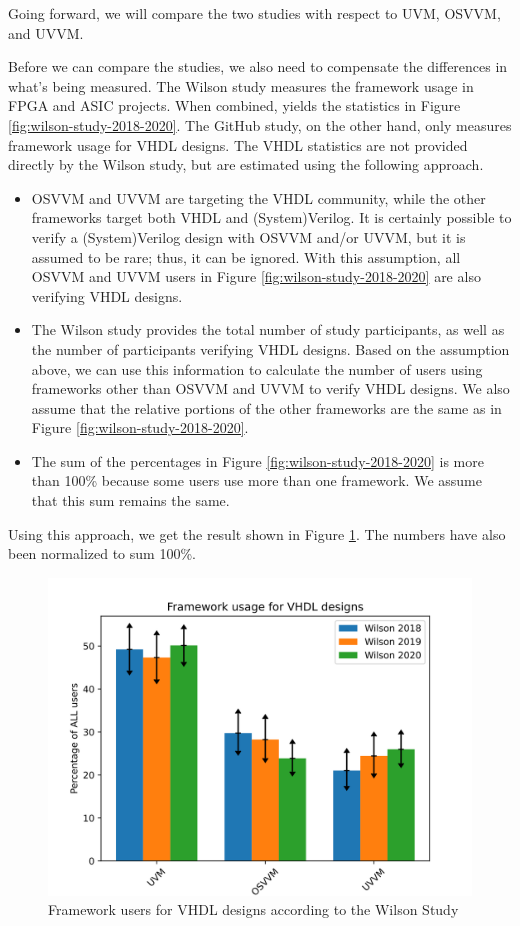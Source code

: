 \documentclass[]{article}
\providecommand{\tightlist}{%
  \setlength{\itemsep}{0pt}\setlength{\parskip}{0pt}}
\begin{document}
Going forward, we will compare the two studies with respect to UVM, OSVVM, and UVVM.

Before we can compare the studies, we also need to compensate the differences in what's being measured. The Wilson study measures the framework usage in FPGA and ASIC projects. When combined, yields the statistics in Figure \ref{fig:wilson-study-2018-2020}. The GitHub study, on the other hand, only measures framework usage for VHDL designs. The VHDL statistics are not provided directly by the Wilson study, but are estimated using the following approach.

\begin{itemize}
\tightlist
\item
  OSVVM and UVVM are targeting the VHDL community, while the other frameworks target both VHDL and (System)Verilog. It is certainly possible to verify a (System)Verilog design with OSVVM and/or UVVM, but it is assumed to be rare; thus, it can be ignored. With this assumption, all OSVVM and UVVM users in Figure \ref{fig:wilson-study-2018-2020} are also verifying VHDL designs.
\item
  The Wilson study provides the total number of study participants, as well as the number of participants verifying VHDL designs. Based on the assumption above, we can use this information to calculate the number of users using frameworks other than OSVVM and UVVM to verify VHDL designs. We also assume that the relative portions of the other frameworks are the same as in Figure \ref{fig:wilson-study-2018-2020}.
\item
  The sum of the percentages in Figure \ref{fig:wilson-study-2018-2020} is more than 100\% because some users use more than one framework. We assume that this sum remains the same.
\end{itemize}

Using this approach, we get the result shown in Figure \ref{fig:wilson-study-vhdl-2018-2020}. The numbers have also been normalized to sum 100\%.

\begin{figure}

{\centering \includegraphics[width=0.85\linewidth]{img/wilson_study_vhdl_2018_2020} 

}

\caption{Framework users for VHDL designs according to the Wilson Study}\label{fig:wilson-study-vhdl-2018-2020}
\end{figure}
\end{document}
